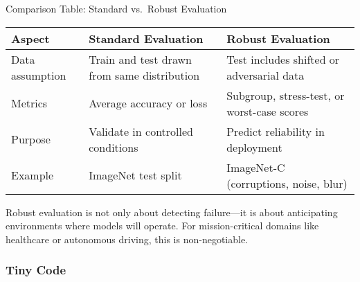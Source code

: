 \documentclass[
  letterpaper,
  DIV=11,
  numbers=noendperiod]{scrreprt}
\begin{document}
Comparison Table: Standard vs.~Robust Evaluation

\begin{longtable}[]{@{}
  >{\raggedright\arraybackslash}p{}
  >{\raggedright\arraybackslash}p{}
  >{\raggedright\arraybackslash}p{}@{}}
\toprule\noalign{}
\begin{minipage}[b]{\linewidth}\raggedright
Aspect
\end{minipage} & \begin{minipage}[b]{\linewidth}\raggedright
Standard Evaluation
\end{minipage} & \begin{minipage}[b]{\linewidth}\raggedright
Robust Evaluation
\end{minipage} \\
\midrule\noalign{}
\endhead
\bottomrule\noalign{}
\endlastfoot
Data assumption & Train and test drawn from same distribution & Test
includes shifted or adversarial data \\
Metrics & Average accuracy or loss & Subgroup, stress-test, or
worst-case scores \\
Purpose & Validate in controlled conditions & Predict reliability in
deployment \\
Example & ImageNet test split & ImageNet-C (corruptions, noise, blur) \\
\end{longtable}

Robust evaluation is not only about detecting failure---it is about
anticipating environments where models will operate. For
mission-critical domains like healthcare or autonomous driving, this is
non-negotiable.

\subsubsection{Tiny Code}\label{tiny-code-87}
\end{document}
